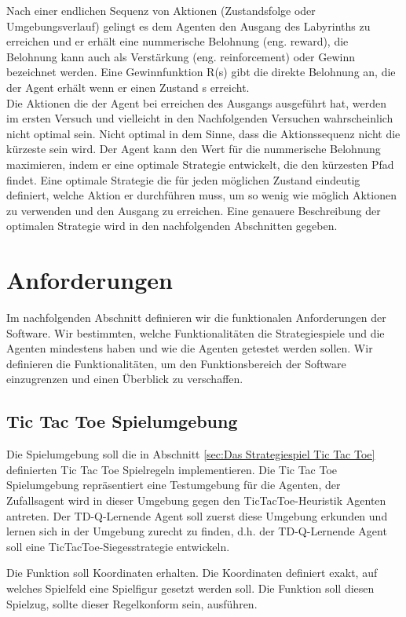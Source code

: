 Nach einer endlichen Sequenz von Aktionen (Zustandsfolge oder Umgebungsverlauf) gelingt es dem Agenten den Ausgang des Labyrinths zu erreichen und er erhält eine nummerische Belohnung (eng. reward), die Belohnung kann auch als Verstärkung (eng. reinforcement) oder Gewinn bezeichnet werden. Eine Gewinnfunktion R(s) gibt die direkte Belohnung an, die der Agent erhält wenn er einen Zustand s erreicht. \\

Die Aktionen die der Agent bei erreichen des Ausgangs ausgeführt hat, werden im ersten Versuch und vielleicht in den Nachfolgenden Versuchen wahrscheinlich nicht optimal sein. Nicht optimal in dem Sinne, dass die Aktionssequenz nicht die kürzeste sein wird. Der Agent kann den Wert für die nummerische Belohnung maximieren, indem er eine optimale Strategie entwickelt, die den kürzesten Pfad findet. Eine optimale Strategie die für jeden möglichen Zustand eindeutig definiert, welche Aktion er durchführen muss, um so wenig wie möglich Aktionen zu verwenden und den Ausgang zu erreichen. Eine genauere Beschreibung der optimalen Strategie wird in den nachfolgenden Abschnitten gegeben.\\

\section{Anforderungen}
\label{sec:Anforderungen}
Im nachfolgenden Abschnitt definieren wir die funktionalen Anforderungen der Software. Wir bestimmten, welche Funktionalitäten die Strategiespiele und die Agenten mindestens haben und wie die Agenten getestet werden sollen. Wir definieren die Funktionalitäten, um den Funktionsbereich der Software einzugrenzen und einen Überblick zu verschaffen.

\subsection{Tic Tac Toe Spielumgebung}
Die Spielumgebung soll die in Abschnitt \ref{sec:Das Strategiespiel Tic Tac Toe} definierten Tic Tac Toe Spielregeln implementieren. Die Tic Tac Toe Spielumgebung repräsentiert eine Testumgebung für die Agenten, der Zufallsagent wird in dieser Umgebung gegen den TicTacToe-Heuristik Agenten antreten. Der TD-Q-Lernende Agent soll zuerst diese Umgebung erkunden und lernen sich in der Umgebung zurecht zu finden, d.h. der TD-Q-Lernende Agent soll eine TicTacToe-Siegesstrategie entwickeln. 

Die Funktion soll Koordinaten erhalten. Die Koordinaten definiert exakt, auf welches Spielfeld eine Spielfigur gesetzt werden soll. Die Funktion soll diesen Spielzug, sollte dieser Regelkonform sein, ausführen.

